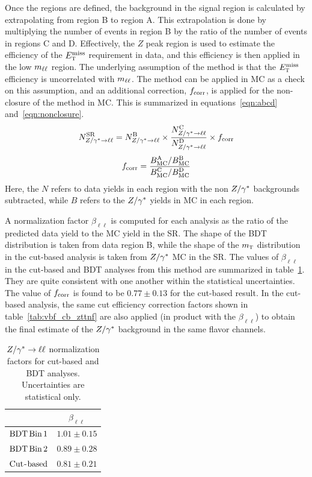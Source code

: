 Once the regions are defined, the background in the signal region is calculated by extrapolating from region B to region A. This extrapolation is done by multiplying the number of events in region B by the ratio of the number of events in regions C and D. Effectively, the $Z$ peak region is used to estimate the efficiency of the $E_{\textrm{\footnotesize\sc t}}^{\rm miss}$ requirement in data, and this efficiency is then applied in the low $m_{\ell\ell}$ region. The underlying assumption of the method is that the $E_{\textrm{\footnotesize\sc t}}^{\rm miss}$ efficiency is uncorrelated with $m_{\ell\ell}$. The method can be applied in MC as a check on this assumption, and an additional correction, $f_{\rm corr}$, is applied for the non-closure of the method in MC. This is summarized in equations~\ref{eqn:abcd} and~\ref{eqn:nonclosure}.
%
\begin{equation}
N^{\rm SR}_{Z/\gamma^{\ast}\to\ell\ell} = N^{\rm B}_{Z/\gamma^{\ast}\to\ell\ell}  \times \frac{N^{\rm C}_{Z/\gamma^{\ast}\to\ell\ell}}{N^{\rm D}_{Z/\gamma^{\ast}\to\ell\ell} } \times f_{\rm corr}
\label{eqn:abcd}
\end{equation}
%
\begin{equation}
f_{\rm corr} = \frac{B_{\rm MC}^{\rm A}/B_{\rm MC}^{\rm B}}{B_{\rm MC}^{\rm C}/B_{\rm MC}^{\rm D}}
\label{eqn:nonclosure}
\end{equation}
%
Here, the $N$ refers to data yields in each region with the non $Z/\gamma^{\ast}$ backgrounds subtracted, while $B$ refers to the $Z/\gamma^{\ast}$ yields in MC in each region.

A normalization factor $\beta_{\ell\ell}$ is computed for each analysis as the ratio of the predicted data yield to the MC yield in the SR. The shape of the BDT distribution is taken from data region B, while the shape of the $m_{\textrm{\footnotesize\sc t}}$ distribution in the cut-based analysis is taken from $Z/\gamma^{\ast}$ MC in the SR. The values of $\beta_{\ell\ell}$ in the cut-based and BDT analyses from this method are summarized in table~\ref{tab:vbf_sf_nf}. They are quite consistent with one another within the statistical uncertainties. The value of $f_{\rm corr}$ is found to be $0.77\pm 0.13$ for the cut-based result. In the cut-based analysis, the same cut efficiency correction factors shown in table~\ref{tab:vbf_cb_zttnf} are also applied (in product with the $\beta_{\ell\ell}$) to obtain the final estimate of the $Z/\gamma^{\ast}$ background in the same flavor channels. 

\begin{table}[h!]
\centering
\captionsetup{justification=centering}
\begin{tabular}{|c|c|}
\hline
& $\beta_{\ell\ell}$ \\ \hline
$\rm BDT\,Bin\,1$ & $1.01 \pm 0.15$ \\ \hline
$\rm BDT\,Bin\,2$ & $0.89 \pm 0.28$ \\ \hline
$\rm Cut$-$\rm based$ & $0.81 \pm 0.21$ \\ \hline
\end{tabular}
\caption{$Z/\gamma^{\ast} \to \ell\ell$ normalization factors for cut-based and BDT analyses. Uncertainties are statistical only.}
\label{tab:vbf_sf_nf}
\end{table}


